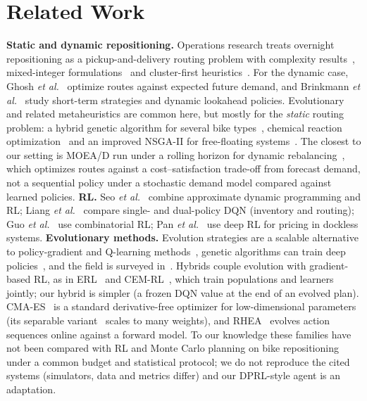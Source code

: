 \documentclass[conference,a4paper]{IEEEtran}
\begin{document}
\section{Related Work}
\textbf{Static and dynamic repositioning.} Operations research treats overnight repositioning as a pickup-and-delivery routing problem with complexity
results~\cite{benchimol2011}, mixed-integer formulations~\cite{raviv2013,dellamico2014} and cluster-first heuristics~\cite{schuijbroek2017}. For the dynamic case,
Ghosh \emph{et al.}~\cite{ghosh2017} optimize routes against expected future demand, and Brinkmann \emph{et al.}~\cite{brinkmann2015,brinkmann2019} study short-term
strategies and dynamic lookahead policies.
Evolutionary and related metaheuristics are common here, but mostly for the \emph{static} routing problem: a hybrid genetic algorithm for several bike
types~\cite{li2016}, chemical reaction optimization~\cite{szeto2016} and an improved NSGA-II for free-floating systems~\cite{chen2022}. The closest to our setting is MOEA/D run
under a rolling horizon for dynamic rebalancing~\cite{hu2021}, which optimizes routes against a cost--satisfaction trade-off from forecast demand, not a sequential policy under
a stochastic demand model compared against learned policies.
\textbf{RL.} Seo \emph{et al.}~\cite{seo2022} combine approximate dynamic programming and RL; Liang \emph{et al.}~\cite{liang2024} compare single- and dual-policy DQN
(inventory and routing); Guo \emph{et al.}~\cite{guo2024} use combinatorial RL; Pan \emph{et al.}~\cite{pan2019} use deep RL for pricing in dockless systems.
\textbf{Evolutionary methods.} Evolution strategies are a scalable alternative to policy-gradient and Q-learning methods~\cite{salimans2017}, genetic algorithms can train
deep policies~\cite{such2017}, and the field is surveyed in~\cite{bai2023}. Hybrids couple evolution with gradient-based RL, as in ERL~\cite{khadka2018} and CEM-RL~\cite{pourchot2019}, which train populations and learners jointly; our hybrid
is simpler (a frozen DQN value at the end of an evolved plan). CMA-ES~\cite{hansen2001,hansen2016} is a standard derivative-free optimizer for
low-dimensional parameters (its separable variant~\cite{ros2008} scales to many weights), and RHEA~\cite{perezliebana2013} evolves action sequences online against a forward model. To our knowledge these families have not been
compared with RL and Monte Carlo planning on bike repositioning under a common budget and statistical protocol; we do not reproduce the cited systems (simulators, data
and metrics differ) and our DPRL-style agent is an adaptation.
\end{document}
